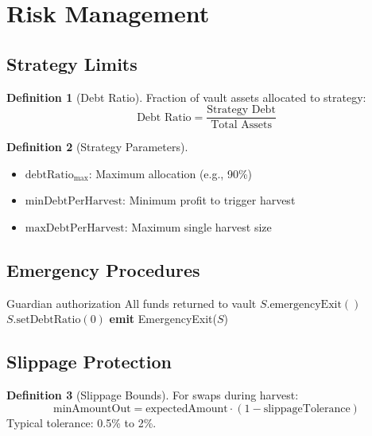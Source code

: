 \documentclass[11pt,a4paper]{article}
\theoremstyle{definition}
\newtheorem{definition}{Definition}
\begin{document}
\section{Risk Management}

\subsection{Strategy Limits}

\begin{definition}[Debt Ratio]
Fraction of vault assets allocated to strategy:
\begin{equation}
\text{Debt Ratio} = \frac{\text{Strategy Debt}}{\text{Total Assets}}
\end{equation}
\end{definition}

\begin{definition}[Strategy Parameters]
\begin{itemize}
\item $\text{debtRatio}_{\max}$: Maximum allocation (e.g., 90\%)
\item $\text{minDebtPerHarvest}$: Minimum profit to trigger harvest
\item $\text{maxDebtPerHarvest}$: Maximum single harvest size
\end{itemize}
\end{definition}

\subsection{Emergency Procedures}

\begin{algorithm}
\caption{Emergency Withdrawal}
\begin{algorithmic}[1]
\Require Guardian authorization
\Ensure All funds returned to vault
\State $S.\text{emergencyExit}()$
\State $S.\text{setDebtRatio}(0)$
\State \textbf{emit} EmergencyExit($S$)
\end{algorithmic}
\end{algorithm}

\subsection{Slippage Protection}

\begin{definition}[Slippage Bounds]
For swaps during harvest:
\begin{equation}
\text{minAmountOut} = \text{expectedAmount} \cdot (1 - \text{slippageTolerance})
\end{equation}
Typical tolerance: 0.5\% to 2\%.
\end{definition}
\end{document}
